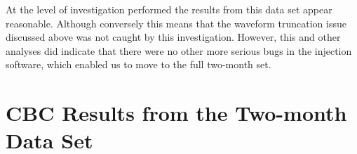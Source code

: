 At the level of investigation performed the results from this data set
appear reasonable.  Although conversely this means that the waveform
truncation issue discussed above was not caught by this investigation.
However, this and other analyses did indicate that there were no other
more serious bugs in the injection software, which enabled us to move
to the full two-month set.

\section{CBC Results from the Two-month Data Set}
\label{sec:ninjna2_two_months}

